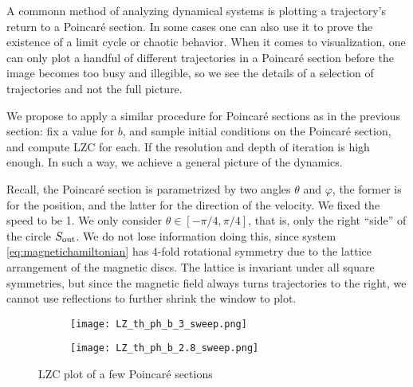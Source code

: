 A commonn method of analyzing dynamical systems is plotting a trajectory's return to a Poincar\'e section. In some cases one can also use it to prove the existence of a limit cycle or chaotic behavior. When it comes to visualization, one can only plot a handful of different trajectories in a Poincar\'e section before the image becomes too busy and illegible, so we see the details of a selection of trajectories and not the full picture.

We propose to apply a similar procedure for Poincar\'e sections as in the previous section: fix a value for $b$, and sample initial conditions on the Poincar\'e section, and compute LZC for each. If the resolution and depth of iteration is high enough. In such a way, we achieve a general picture of the dynamics.

Recall, the Poincar\'e section is parametrized by two angles $\theta$ and $\varphi$, the former is for the position, and the latter for the direction of the velocity. We fixed the speed to be 1. We only consider $\theta\in[-\pi/4,\pi/4]$, that is, only the right ``side'' of the circle $S_\text{out}$. We do not lose information doing this, since system \cref{eq:magnetichamiltonian} has 4-fold rotational symmetry due to the lattice arrangement of the magnetic discs. The lattice is invariant under all square symmetries, but since the magnetic field always turns trajectories to the right, we cannot use reflections to further shrink the window to plot.

\begin{figure}[!th]
\centering
\begin{subfigure}[h]{0.49\textwidth}
\centering
\texttt{[image: LZ\_th\_ph\_b\_3\_sweep.png]}
\caption{}
\label{subfig:LZpoincaresectionb3}
\end{subfigure}
%
\begin{subfigure}[h]{0.49\textwidth}
\centering
\texttt{[image: LZ\_th\_ph\_b\_2.8\_sweep.png]}
\caption{}
\label{subfig:LZpoincaresectionb2.8}
\end{subfigure}
\caption{LZC plot of a few Poincar\'e sections}
\label{fig:LZpoincare1}
\end{figure}

